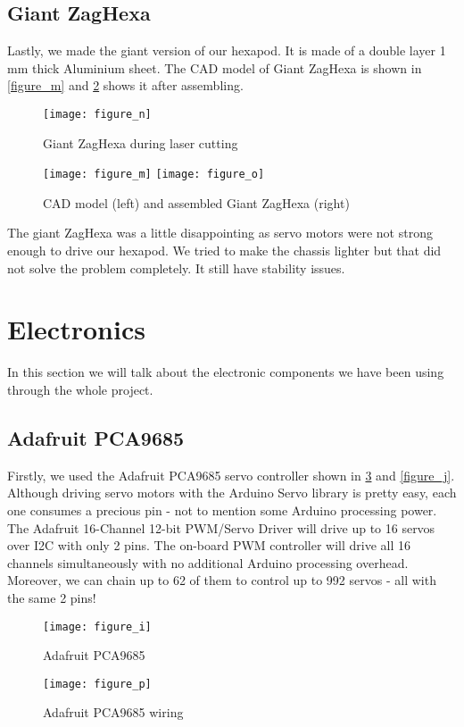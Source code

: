\subsection{Giant ZagHexa}
Lastly, we made the giant version of our hexapod. It is made of a double layer 1 mm thick Aluminium sheet. The CAD model of Giant ZagHexa is shown in \ref{figure_m} and \ref{figure_o} shows it after assembling.
\begin{figure}[h]
	\centering
	\texttt{[image: figure\_n]}
	\caption{Giant ZagHexa during laser cutting}
	\label{figure_n}
\end{figure}
\begin{figure}[h]
	\centering
    	\texttt{[image: figure\_m]}
	\texttt{[image: figure\_o]}
	\caption{CAD model (left) and assembled Giant ZagHexa (right)}
	\label{figure_o}
\end{figure}
The giant ZagHexa was a little disappointing as servo motors were not strong enough to drive our hexapod. We tried to make the chassis lighter but that did not solve the problem completely. It still have stability issues.

\section{Electronics}
In this section we will talk about the electronic components we have been using through the whole project.

\subsection{Adafruit PCA9685}
Firstly, we used the Adafruit PCA9685 servo controller shown in \ref{figure_i} and \ref{figure_j}. Although driving servo motors with the Arduino Servo library is pretty easy, each one consumes a precious pin - not to mention some Arduino processing power.  The Adafruit 16-Channel 12-bit PWM/Servo Driver will drive up to 16 servos over I2C with only 2 pins.  The on-board PWM controller will drive all 16 channels simultaneously with no additional Arduino processing overhead.  Moreover, we can chain up to 62 of them to control up to 992 servos - all with the same 2 pins!

\begin{figure}[h]
	\centering
	\texttt{[image: figure\_i]}
	\caption{Adafruit PCA9685}
	\label{figure_i}
\end{figure}

\begin{figure}[h]
	\centering
	\texttt{[image: figure\_p]}
	\caption{Adafruit PCA9685 wiring}
	\label{figure_p}
\end{figure}

